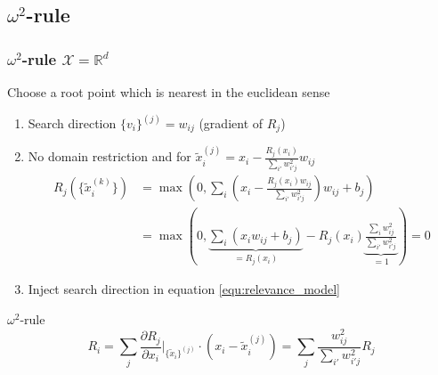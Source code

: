 \documentclass{beamer}
\begin{document}
\subsection[$\omega^2$-rule]{$\omega^2$-rule}


\begin{frame}
\frametitle{$\omega^2$-rule $\mathcal{X}=\mathbb{R}^d$}
\vspace{0.35cm}
Choose a root point which is nearest in the euclidean sense\\

\begin{enumerate}
	\item Search direction $\{v_i\}^{(j)} = w_{ij}$ (gradient of $R_j$)
	\item No domain restriction and for $\tilde{x}_i^{(j)} = x_i - \frac{R_j(x_i)}{\sum_{i'}w_{i'j}^2} w_{ij}$
	\begin{align*}
		R_j(\{\tilde{x}_i^{(k)}\}) &= \max(0, \sum_i (x_i -\frac{R_j(x_i) w_{ij}}{\sum_{i'}w_{i'j}^2}) w_{ij}  + b_j) \\
		&= \max(0, \underbrace{\sum_i (x_i w_{ij} + b_j)}_{=R_j(x_i)} - R_j (x_i) \underbrace{\frac{\sum_{i}w_{ij}^2}{\sum_{i'}w_{i'j}^2}}_{=1} )= 0 
	\end{align*}
	\vspace{-0.1cm}
	\item Inject search direction in equation \eqref{equ:relevance_model}
\end{enumerate}

\pause
\vspace{-0.15cm}
\begin{block}{$\omega^2$-rule}
\begin{equation*}
R_i =\sum_j\frac{\partial R_j}{\partial x_i}\Big|_{\{\tilde{x}_i\}^{(j)}} \cdot (x_i - \tilde{x}_i^{(j)}) =  \sum_j\frac{w_{ij}^2}{\sum_{i'} w_{i'j}^2} R_j
\end{equation*}
\end{block}



\end{frame}
\end{document}
